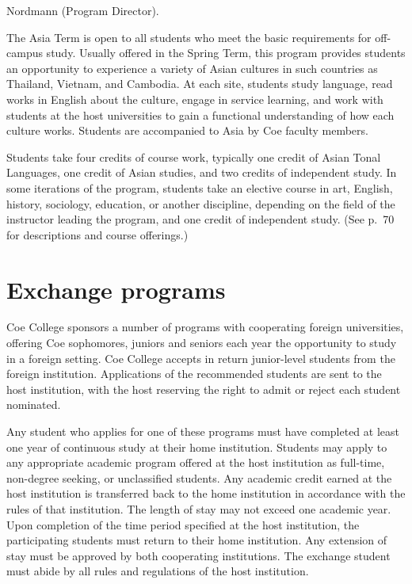 \documentclass[
  letterpaper,
]{scrbook}
\begin{document}
Nordmann (Program Director).

The Asia Term is open to all students who meet the basic requirements
for off-campus study. Usually offered in the Spring Term, this program
provides students an opportunity to experience a variety of Asian
cultures in such countries as Thailand, Vietnam, and Cambodia. At each
site, students study language, read works in English about the culture,
engage in service learning, and work with students at the host
universities to gain a functional understanding of how each culture
works. Students are accompanied to Asia by Coe faculty members.

Students take four credits of course work, typically one credit of Asian
Tonal Languages, one credit of Asian studies, and two credits of
independent study. In some iterations of the program, students take an
elective course in art, English, history, sociology, education, or
another discipline, depending on the field of the instructor leading the
program, and one credit of independent study. (See p.~70 for
descriptions and course offerings.)

\hypertarget{exchange-programs}{%
\section{Exchange programs}\label{exchange-programs}}

Coe College sponsors a number of programs with cooperating foreign
universities, offering Coe sophomores, juniors and seniors each year the
opportunity to study in a foreign setting. Coe College accepts in return
junior-level students from the foreign institution. Applications of the
recommended students are sent to the host institution, with the host
reserving the right to admit or reject each student nominated.

Any student who applies for one of these programs must have completed at
least one year of continuous study at their home institution. Students
may apply to any appropriate academic program offered at the host
institution as full-time, non-degree seeking, or unclassified students.
Any academic credit earned at the host institution is transferred back
to the home institution in accordance with the rules of that
institution. The length of stay may not exceed one academic year. Upon
completion of the time period specified at the host institution, the
participating students must return to their home institution. Any
extension of stay must be approved by both cooperating institutions. The
exchange student must abide by all rules and regulations of the host
institution.
\end{document}
